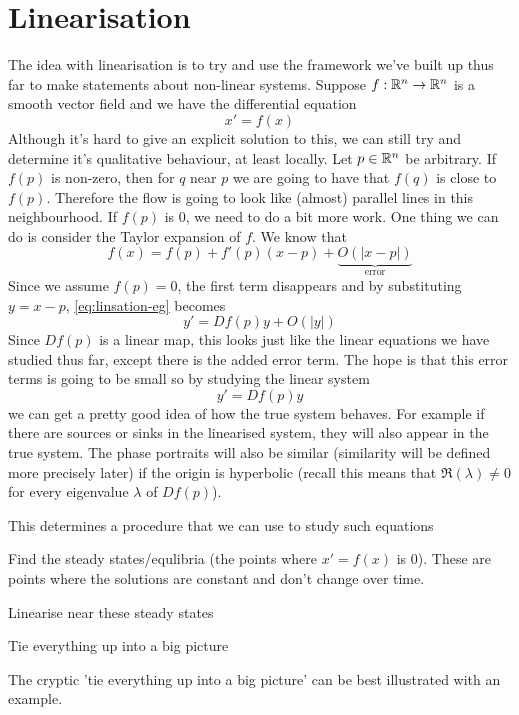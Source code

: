 \section{Linearisation}
The idea with linearisation is to try and use the framework we've built up thus far to make statements about non-linear systems.
Suppose $f: \mathbb{R}^n \to \mathbb{R}^n$ is a smooth vector field and we have the differential equation
\begin{equation}\label{eq:linsation-eg}
    x' = f(x)
\end{equation}
Although it's hard to give an explicit solution to this, we can still try and determine it's qualitative behaviour, at least locally. Let $p \in \mathbb{R}^n$ be arbitrary. If $f(p)$ is non-zero, then for $q$ near $p$ we are going to have that $f(q)$ is close to $f(p)$. Therefore the flow is going to look like (almost) parallel lines in this neighbourhood. If $f(p)$ is 0, we need to do a bit more work. One thing we can do is consider the Taylor expansion of $f$. We know that
$$ f(x) = f(p) + f'(p)(x - p) + \underbrace{O(|x - p|)}_{\text{error}} $$
Since we assume $f(p) = 0$, the first term disappears and by substituting $y = x - p$, \autoref{eq:linsation-eg} becomes
$$ y' = Df(p)y + O(|y|) $$
Since $Df(p)$ is a linear map, this looks just like the linear equations we have studied thus far, except there is the added error term. The hope is that this error terms is going to be small so by studying the linear system
$$ y' = Df(p) y $$
we can get a pretty good idea of how the true system behaves. For example if there are sources or sinks in the linearised system, they will also appear in the true system. The phase portraits will also be similar (similarity will be defined more precisely later) if the origin is hyperbolic (recall this means that $\Re(\lambda) \neq 0$ for every eigenvalue $\lambda$ of $Df(p)$).

This determines a procedure that we can use to study such equations
\begin{minenumerate}
    \item Find the steady states/equlibria (the points where $x' = f(x)$ is 0). These are points where the solutions are constant and don't change over time.
    \item Linearise near these steady states
    \item Tie everything up into a big picture
\end{minenumerate}
The cryptic 'tie everything up into a big picture' can be best illustrated with an example.

